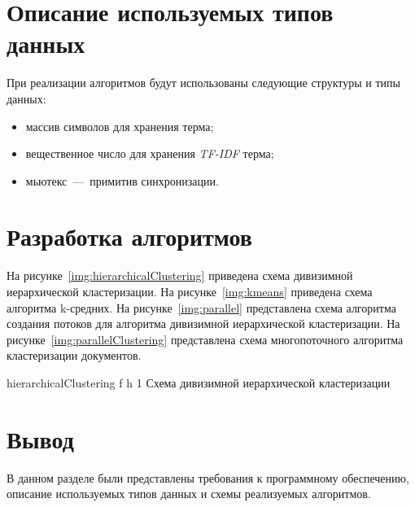 \section{Описание используемых типов данных}

При реализации алгоритмов будут использованы следующие структуры и типы данных:
\begin{itemize}
	\item массив символов для хранения терма;
	\item вещественное число для хранения \textit{TF-IDF} терма;
	\item мьютекс~---~примитив синхронизации.
\end{itemize}

\section{Разработка алгоритмов}

На рисунке~\ref{img:hierarchicalClustering} приведена схема дивизимной иерархической кластеризации.
На рисунке~\ref{img:kmeans} приведена схема алгоритма k-средних.
На рисунке~\ref{img:parallel} представлена схема алгоритма создания потоков для алгоритма дивизимной иерархической кластеризации.
На рисунке~\ref{img:parallelClustering} представлена схема многопоточного алгоритма кластеризации документов.

{hierarchicalClustering} %
{f} %
{h} %
{1\textwidth} %
{Схема дивизимной иерархической кластеризации} %
\clearpage

\fi

\section *{Вывод}

В данном разделе были представлены требования к программному обеспечению, описание используемых типов данных и схемы реализуемых алгоритмов.
